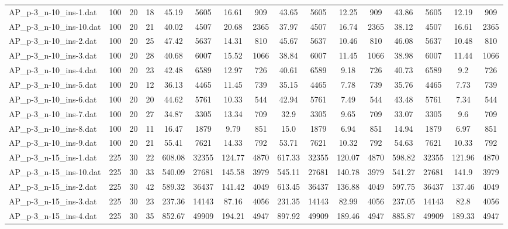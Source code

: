 \begin{sidewaystable}[!ht]
{\begin{tabular}{lccccccccccccccc}
AP\_p-3\_n-10\_ins-1.dat & 100 & 20 & 18 & 45.19 & 5605 & 16.61 & 909 & 43.65 & 5605 & 12.25 & 909 & 43.86 & 5605 & 12.19 & 909 \\
AP\_p-3\_n-10\_ins-10.dat & 100 & 20 & 21 & 40.02 & 4507 & 20.68 & 2365 & 37.97 & 4507 & 16.74 & 2365 & 38.12 & 4507 & 16.61 & 2365 \\
AP\_p-3\_n-10\_ins-2.dat & 100 & 20 & 25 & 47.42 & 5637 & 14.31 & 810 & 45.67 & 5637 &  \textcolor{blue2}{10.46} & 810 & 46.08 & 5637 & 10.48 & 810 \\
AP\_p-3\_n-10\_ins-3.dat & 100 & 20 & 28 & 40.68 & 6007 & 15.52 & 1066 & 38.84 & 6007 & 11.45 & 1066 & 38.98 & 6007 & 11.44 & 1066 \\
AP\_p-3\_n-10\_ins-4.dat & 100 & 20 & 23 & 42.48 & 6589 & 12.97 & 726 & 40.61 & 6589 &  \textcolor{blue2}{9.18} & 726 & 40.73 & 6589 & 9.2 & 726 \\
AP\_p-3\_n-10\_ins-5.dat & 100 & 20 & 12 & 36.13 & 4465 & 11.45 & 739 & 35.15 & 4465 & 7.78 & 739 & 35.76 & 4465 & 7.73 & 739 \\
AP\_p-3\_n-10\_ins-6.dat & 100 & 20 & 20 & 44.62 & 5761 & 10.33 & 544 & 42.94 & 5761 & 7.49 & 544 & 43.48 & 5761 &  \textcolor{blue2}{7.34} & 544 \\
AP\_p-3\_n-10\_ins-7.dat & 100 & 20 & 27 & 34.87 & 3305 & 13.34 & 709 & 32.9 & 3305 & 9.65 & 709 & 33.07 & 3305 &  \textcolor{blue2}{9.6} & 709 \\
AP\_p-3\_n-10\_ins-8.dat & 100 & 20 & 11 & 16.47 & 1879 & 9.79 & 851 & 15.0 & 1879 & 6.94 & 851 & 14.94 & 1879 & 6.97 & 851 \\
AP\_p-3\_n-10\_ins-9.dat & 100 & 20 & 21 & 55.41 & 7621 & 14.33 & 792 & 53.71 & 7621 &  \textcolor{blue2}{10.32} & 792 & 54.63 & 7621 & 10.33 & 792 \\
AP\_p-3\_n-15\_ins-1.dat & 225 & 30 & 22 & 608.08 & 32355 & 124.77 & 4870 & 617.33 & 32355 & 120.07 & 4870 & 598.82 & 32355 & 121.96 & 4870 \\
AP\_p-3\_n-15\_ins-10.dat & 225 & 30 & 33 & 540.09 & 27681 & 145.58 & 3979 & 545.11 & 27681 & 140.78 & 3979 & 541.27 & 27681 & 141.9 & 3979 \\
AP\_p-3\_n-15\_ins-2.dat & 225 & 30 & 42 & 589.32 & 36437 & 141.42 & 4049 & 613.45 & 36437 &  \textcolor{blue2}{136.88} & 4049 & 597.75 & 36437 & 137.46 & 4049 \\
AP\_p-3\_n-15\_ins-3.dat & 225 & 30 & 23 & 237.36 & 14143 & 87.16 & 4056 & 231.35 & 14143 & 82.99 & 4056 & 237.05 & 14143 &  \textcolor{blue2}{82.8} & 4056 \\
AP\_p-3\_n-15\_ins-4.dat & 225 & 30 & 35 & 852.67 & 49909 & 194.21 & 4947 & 897.92 & 49909 & 189.46 & 4947 & 885.87 & 49909 & 189.33 & 4947 \\

\end{tabular}}
\end{sidewaystable}
